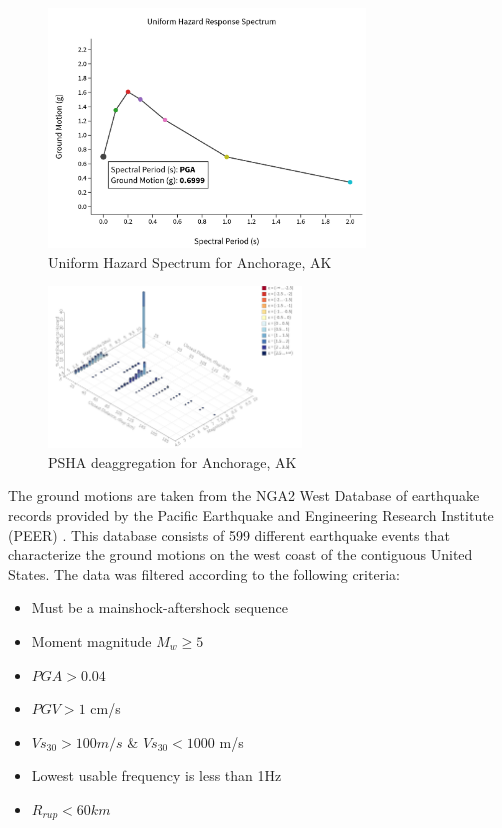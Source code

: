 \begin{figure}[htbp]
	\centering
	\includegraphics[width=0.75\textwidth]{Chapter-5/figs/UniformHazardResponseSpectrum_AK}
	\caption{Uniform Hazard Spectrum for Anchorage, AK}
	\label{fig:UHS_AK}
\end{figure}

\begin{figure}[htbp]
	\centering
	\includegraphics[width=0.6\textwidth]{Chapter-5/figs/PSHA_Deaggregation_Anchorage_AK}
	\caption{PSHA deaggregation for Anchorage, AK}
	\label{fig:PSHA_AK}
\end{figure}
\newpage
The ground motions are taken from the NGA2 West Database of earthquake records provided by the Pacific Earthquake and Engineering Research Institute (PEER) \cite{Ancheta2014}. This database consists of 599 different earthquake events that characterize the ground motions on the west coast of the contiguous United States. The data was filtered according to the following criteria:

\begin{itemize}
	\item Must be a mainshock-aftershock sequence
	\item Moment magnitude $M_w \geqslant 5$
	\item $PGA>0.04$
	\item $PGV>1$ cm/s
	\item $Vs_{30}>100m/s$ \& $Vs_{30}<1000$ m/s
	\item Lowest usable frequency is less than 1Hz
	\item $R_{rup}<60km$
\end{itemize}

